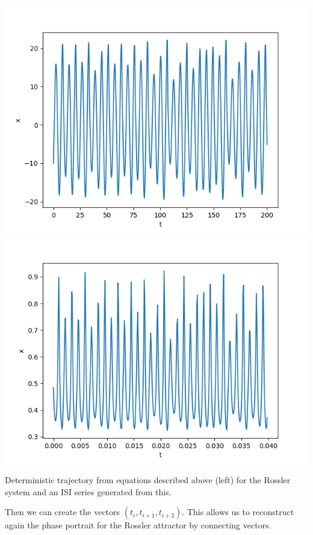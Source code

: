 \documentclass[10pt]{article}
\begin{document}
\begin{center}
\includegraphics[scale=0.5]{real_trajectory_rossler} \includegraphics[scale=0.5]{reconstructed_trajectory_rossler}
\caption{Deterministic trajectory from equations described above (left) for the Rossler system and an ISI series generated from this.}
\label{fig:rossler_xprima}
\end{center}

Then we can create the vectors $(t_i,t_{i+1},t_{i+2})$. This allows us to reconstruct again the phase portrait for the Rossler attractor by connecting vectors.
\end{document}
